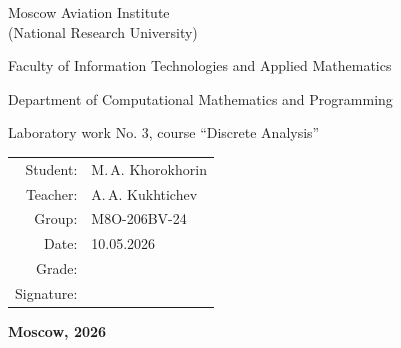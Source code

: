 \begin{titlepage}
\begin{center}
\bfseries

{\Large Moscow Aviation Institute\\ (National Research University)

}

\vspace{48pt}

{\large Faculty of Information Technologies and Applied Mathematics
}

\vspace{36pt}

{\large Department of Computational Mathematics and Programming

}

\vspace{48pt}

Laboratory work No. 3, course \enquote{Discrete Analysis}

\end{center}

\vspace{72pt}

\begin{flushright}
\begin{tabular}{rl}
Student: & M.\,A. Khorokhorin \\
Teacher: & A.\,A. Kukhtichev \\
Group: & M8O-206BV-24 \\
Date: & 10.05.2026 \\
Grade: & \\
Signature: & \\
\end{tabular}
\end{flushright}

\vfill

\begin{center}
\bfseries
Moscow, 2026
\end{center}
\end{titlepage}

\pagebreak
